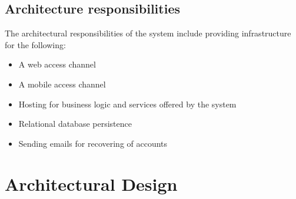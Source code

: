\documentclass[11pt,a4paper,titlepage]{article}
\begin{document}
	\subsection{Architecture responsibilities}
	The architectural responsibilities of the system include providing infrastructure for the following:
		\begin{itemize}
			\item A web access channel
			\item A mobile access channel
			\item Hosting for business logic and services offered by the system
			\item Relational database persistence
			\item Sending emails for recovering of accounts
		\end{itemize}
\section{Architectural Design}
\end{document}
